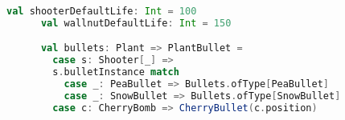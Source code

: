 \begin{lstlisting}[language=Scala, label=default-values, caption=Plant default values.]
      val shooterDefaultLife: Int = 100
      val wallnutDefaultLife: Int = 150

      val bullets: Plant => PlantBullet =
        case s: Shooter[_] =>
        s.bulletInstance match
          case _: PeaBullet => Bullets.ofType[PeaBullet]
          case _: SnowBullet => Bullets.ofType[SnowBullet]
        case c: CherryBomb => CherryBullet(c.position)
\end{lstlisting}